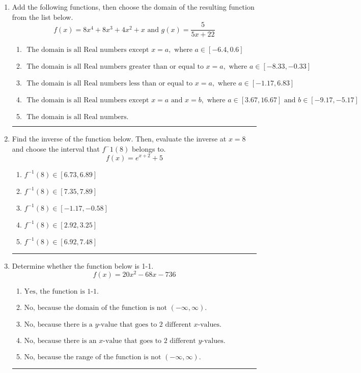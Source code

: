 \documentclass[14pt]{extbook}
\newcommand{\litem}[1]{\item#1\hspace*{-1cm}\rule{\textwidth}{0.4pt}}
\begin{document}
\begin{enumerate}
{\begin{enumerate}[label=\Alph*.]
\end{enumerate} }
\litem{
Add the following functions, then choose the domain of the resulting function from the list below.\[ f(x) = 8x^{4} +8 x^{3} +4 x^{2} +x \text{ and } g(x) = \frac{5}{5x+22} \]\begin{enumerate}[label=\Alph*.]
\item \( \text{ The domain is all Real numbers except } x = a, \text{ where } a \in [-6.4, 0.6] \)
\item \( \text{ The domain is all Real numbers greater than or equal to } x = a, \text{ where } a \in [-8.33, -0.33] \)
\item \( \text{ The domain is all Real numbers less than or equal to } x = a, \text{ where } a \in [-1.17, 6.83] \)
\item \( \text{ The domain is all Real numbers except } x = a \text{ and } x = b, \text{ where } a \in [3.67, 16.67] \text{ and } b \in [-9.17, -5.17] \)
\item \( \text{ The domain is all Real numbers. } \)

\end{enumerate} }
\litem{
Find the inverse of the function below. Then, evaluate the inverse at $x = 8$ and choose the interval that $f^-1(8)$ belongs to.\[ f(x) = e^{x+2}+5 \]\begin{enumerate}[label=\Alph*.]
\item \( f^{-1}(8) \in [6.73, 6.89] \)
\item \( f^{-1}(8) \in [7.35, 7.89] \)
\item \( f^{-1}(8) \in [-1.17, -0.58] \)
\item \( f^{-1}(8) \in [2.92, 3.25] \)
\item \( f^{-1}(8) \in [6.92, 7.48] \)

\end{enumerate} }
\litem{
Determine whether the function below is 1-1.\[ f(x) = 20 x^2 - 68 x - 736 \]\begin{enumerate}[label=\Alph*.]
\item \( \text{Yes, the function is 1-1.} \)
\item \( \text{No, because the domain of the function is not $(-\infty, \infty)$.} \)
\item \( \text{No, because there is a $y$-value that goes to 2 different $x$-values.} \)
\item \( \text{No, because there is an $x$-value that goes to 2 different $y$-values.} \)
\item \( \text{No, because the range of the function is not $(-\infty, \infty)$.} \)


\end{enumerate}}
\end{enumerate}
\end{document}
